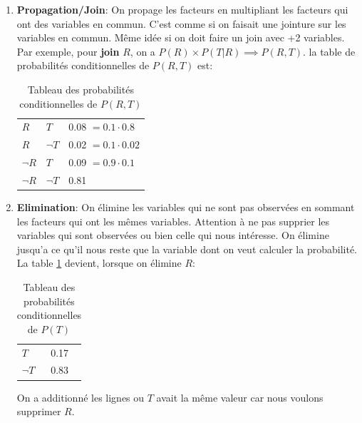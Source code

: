 \begin{enumerate}
    \item \textbf{Propagation/Join}: On propage les facteurs en multipliant les facteurs qui ont des variables en commun. C'est comme si on faisait une jointure sur les variables en commun. Même idée si on doit faire un join avec +2 variables.
        Par exemple, pour \textbf{join} $R$, on a $P(R) \times P(T | R) \implies P(R, T)$.
        la table de probabilités conditionnelles de $P(R, T)$ est: 
        \begin{table}[H]
            \centering
            \begin{tabular}{|l|l|l|}
                \hline
                $R$ & $T$ & 0.08 $= 0.1 \cdot 0.8$ \\ 
                $R$ & $\neg T$ & 0.02 $= 0.1 \cdot 0.02$\\
                $\neg R$ & $T$ & 0.09 $= 0.9 \cdot 0.1$\\
                $\neg R$ & $\neg T$ & 0.81 \\
                \hline
            \end{tabular}
            \caption{Tableau des probabilités conditionnelles de $P(R, T)$}
            \label{tab:rt}
        \end{table}
    \item \textbf{Elimination}: On élimine les variables qui ne sont pas observées en sommant les facteurs qui ont les mêmes variables. 
        Attention à ne pas supprier les variables qui sont observées ou bien celle qui nous intéresse.
        On élimine jusqu'a ce qu'il nous reste que la variable dont on veut calculer la probabilité.
        La table \ref{tab:rt} devient, lorsque on élimine $R$:
        \begin{table}[H]
            \centering
            \begin{tabular}{|l|l|}
                \hline
                $T$ & 0.17 \\ 
                $\neg T$ & 0.83 \\
                \hline
            \end{tabular}
            \caption{Tableau des probabilités conditionnelles de $P(T)$}
            \label{tab:t}
        \end{table}
        On a additionné les lignes ou $T$ avait la même valeur car nous voulons supprimer $R$.


\end{enumerate}




